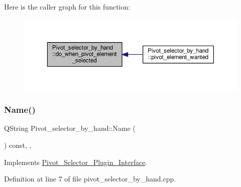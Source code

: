Here is the caller graph for this function\+:\nopagebreak
\begin{figure}[H]
\begin{center}
\leavevmode
\includegraphics[width=350pt]{classPivot__selector__by__hand_a2ee01f0ccc6ad957a46e4d6ecd891645_icgraph}
\end{center}
\end{figure}
\mbox{\label{classPivot__selector__by__hand_adb03a4ea722819c478e5fd71e5e6f364}} 
\subsubsection{\texorpdfstring{Name()}{Name()}}
{\footnotesize\ttfamily Q\+String Pivot\+\_\+selector\+\_\+by\+\_\+hand\+::\+Name (\begin{DoxyParamCaption}{ }\end{DoxyParamCaption}) const\hspace{0.3cm}{\ttfamily [override]}, {\ttfamily [private]}, {\ttfamily [virtual]}}



Implements \hyperlink{classPivot__Selector__Plugin__Interface_a35b4215e27a169edc2260f2e578de184}{Pivot\+\_\+\+Selector\+\_\+\+Plugin\+\_\+\+Interface}.



Definition at line 7 of file pivot\+\_\+selector\+\_\+by\+\_\+hand.\+cpp.

\mbox{\label{classPivot__selector__by__hand_adbb9dac36bf6cc6807433c617c19ad32}} 
